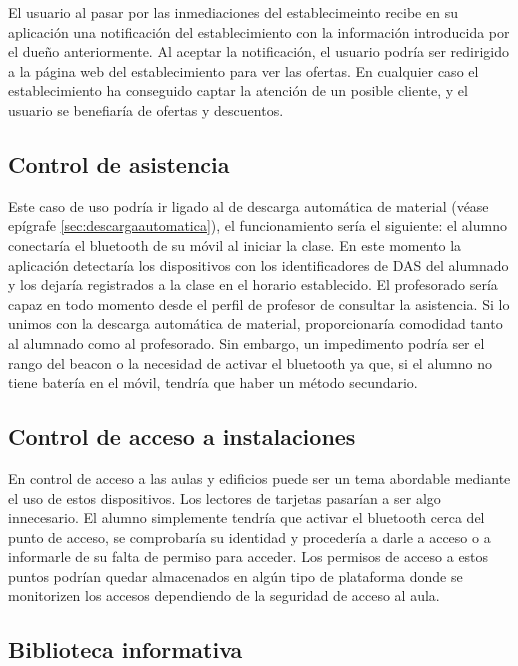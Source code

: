 El usuario al pasar por las inmediaciones del establecimeinto recibe en su aplicación una notificación del establecimiento con la información introducida por el dueño anteriormente. Al aceptar la notificación, el usuario podría ser redirigido a la página web del establecimiento para ver las ofertas. En cualquier caso el establecimiento ha conseguido captar la atención de un posible cliente, y el usuario se benefiaría de ofertas y descuentos. 

\subsection{Control de asistencia}

Este caso de uso podría ir ligado al de descarga automática de material (véase epígrafe \ref{sec:descargaautomatica}), el funcionamiento sería el siguiente: el alumno conectaría el bluetooth de su móvil al iniciar la clase. En este momento la aplicación detectaría los dispositivos con los identificadores de DAS del alumnado y los dejaría registrados a la clase en el horario establecido. El profesorado sería capaz en todo momento desde el perfil de profesor de consultar la asistencia. Si lo unimos con la descarga automática de material, proporcionaría comodidad tanto al alumnado como al profesorado. Sin embargo, un impedimento podría ser el rango del beacon o la necesidad de activar el bluetooth ya que, si el alumno no tiene batería en el móvil, tendría que haber un método secundario. 

\subsection{Control de acceso a instalaciones}

En control de acceso a las aulas y edificios puede ser un tema abordable mediante el uso de estos dispositivos. Los lectores de tarjetas pasarían a ser algo innecesario. El alumno simplemente tendría que activar el bluetooth cerca del punto de acceso, se comprobaría su identidad y procedería a darle a acceso o a informarle de su falta de permiso para acceder. Los permisos de acceso a estos puntos podrían quedar almacenados en algún tipo de plataforma donde se monitorizen los accesos dependiendo de la seguridad de acceso al aula.

\subsection{Biblioteca informativa}

